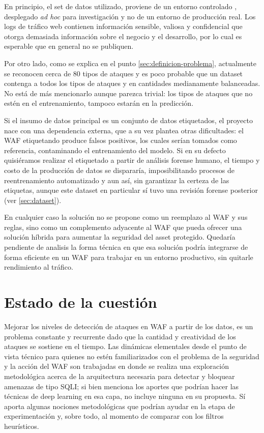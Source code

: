 \documentclass[12pt, a4paper]{article}
\begin{document}
En principio, el set de datos utilizado, proviene de un entorno controlado \cite{riera2022srbhdataset_data}, desplegado \textit{ad hoc} para investigación y no de un entorno de producción real. Los logs de tráfico web contienen información sensible, valiosa y confidencial que otorga demasiada información sobre el negocio y el desarrollo, por lo cual es esperable que en general no se publiquen.

Por otro lado, como se explica en el punto \ref{sec:definicion-problema}, actualmente se reconocen cerca de 80 tipos de ataques y es poco probable que un dataset contenga a todos los tipos de ataques y en cantidades medianamente balanceadas. No está de más mencionarlo aunque parezca trivial: los tipos de ataques que no estén en el entrenamiento, tampoco estarán en la predicción. 

Si el insumo de datos principal es un conjunto de datos etiquetados, el proyecto nace con una dependencia externa, que a su vez plantea otras dificultades: el WAF etiquetando produce falsos positivos, los cuales serían tomados como referencia, contaminando el entrenamiento del modelo. Si en su defecto quisiéramos realizar el etiquetado a partir de análisis forense humano, el tiempo y costo de la producción de datos se dispararía, imposibilitando procesos de reentrenamiento automatizado y aun así, sin garantizar la certeza de las etiquetas, aunque este dataset en particular sí tuvo una revisión forense posterior (ver \ref{sec:dataset}).

En cualquier caso la solución no se propone como un reemplazo al WAF y sus reglas, sino como un complemento adyacente al WAF que pueda ofrecer una solución híbrida para aumentar la seguridad del asset protegido. Quedaría pendiente de analisis la forma técnica en que esa solución podría integrarse de forma eficiente en un WAF para trabajar en un entorno productivo, sin quitarle rendimiento al tráfico. 

\section{Estado de la cuestión}

Mejorar los niveles de detección de ataques en WAF a partir de los datos, es un problema constante y recurrente dado que la cantidad y creatividad de los ataques se sostiene en el tiempo. Las dinámicas elementales desde el punto de vista técnico para quienes no estén familiarizados con el problema de la seguridad y la acción del WAF son trabajadas en \cite{hassan2026improving} donde se realiza una exploración metodológica acerca de la arquitectura necesaria para detectar y bloquear amenazas de tipo SQLI; si bien menciona los aportes que podrían hacer las técnicas de deep learning en esa capa, no incluye ninguna en su propuesta. Sí aporta algunas nociones metodológicas que podrían ayudar en la etapa de experimentación y, sobre todo, al momento de comparar con los filtros heurísticos.
\end{document}
